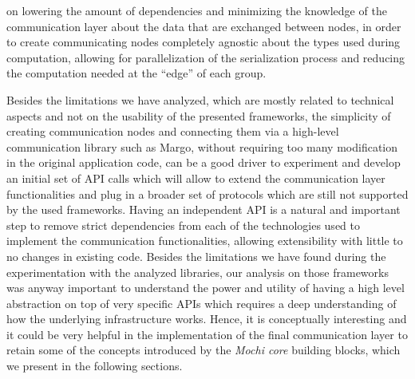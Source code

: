 \documentclass[12pt]{article}
\begin{document}
on lowering the amount of dependencies and minimizing the knowledge of the communication layer about the data that are exchanged between nodes, in order to create communicating nodes completely agnostic about the types used during computation, allowing for parallelization of the serialization process and reducing the computation needed at the ``edge'' of each group.\newline

Besides the limitations we have analyzed, which are mostly related to technical aspects and not on the usability of the presented frameworks, the simplicity of creating communication nodes and connecting them via a high-level communication library such as Margo, without requiring too many modification in the original application code, can be a good driver to experiment and develop an initial set of API calls which will allow to extend the communication layer functionalities and plug in a broader set of protocols which are still not supported by the used frameworks. Having an independent API is a natural and important step to remove strict dependencies from each of the technologies used to implement the communication functionalities, allowing extensibility with little to no changes in existing code.
Besides the limitations we have found during the experimentation with the analyzed libraries, our analysis on those frameworks was anyway important to understand the power and utility of having a high level abstraction on top of very specific APIs which requires a deep understanding of how the underlying infrastructure works. Hence, it is conceptually interesting and it could be very helpful in the implementation of the final communication layer to retain some of the concepts introduced by the \textit{Mochi core} building blocks, which we present in the following sections.\newline
\end{document}
